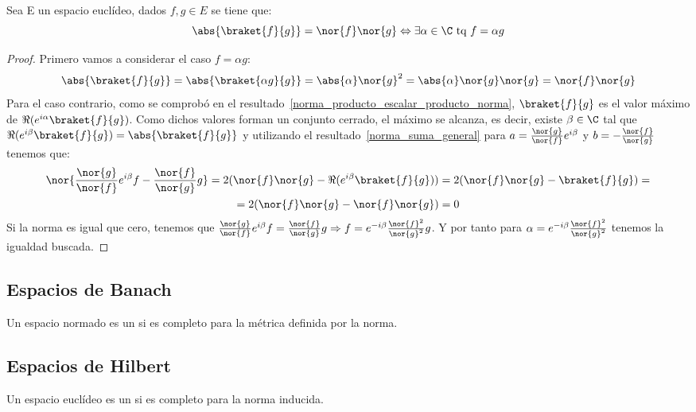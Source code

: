 \begin{proposition}
  Sea E un espacio euclídeo, dados $f,g\in E$ se tiene que:
  \begin{equation}
    \label{norma_producto_escalar_igual_producto_norma}
    \abs{\braket{f}{g}}=\nor{f}\nor{g}\Leftrightarrow \exists\alpha\in\C\text{ tq }f=\alpha g
  \end{equation}
\end{proposition}

\begin{proof}
  Primero vamos a considerar el caso $f=\alpha g$:
  \begin{equation*}
    \abs{\braket{f}{g}}=\abs{\braket{\alpha g}{g}}=\abs{\alpha}\nor{g}^2=\abs{\alpha}\nor{g}\nor{g}=\nor{f}\nor{g}
  \end{equation*}
  Para el caso contrario, como se comprobó en el resultado~\eqref{norma_producto_escalar_producto_norma}, $\braket{f}{g}$ es el valor máximo de $\Re(e^{i\alpha}\braket{f}{g})$. Como dichos valores forman un conjunto cerrado, el máximo se alcanza, es decir, existe $\beta\in\C$ tal que $\Re(e^{i\beta}\braket{f}{g})=\abs{\braket{f}{g}}$ y utilizando el resultado~\eqref{norma_suma_general} para $a=\frac{\nor{g}}{\nor{f}}e^{i\beta}$ y $b=-\frac{\nor{f}}{\nor{g}}$ tenemos que:
  \begin{multline*}
    \nor{\frac{\nor{g}}{\nor{f}}e^{i\beta}f-\frac{\nor{f}}{\nor{g}}g}=2(\nor{f}\nor{g}-\Re(e^{i\beta}\braket{f}{g}))=2(\nor{f}\nor{g}-\braket{f}{g})=\\
    =2(\nor{f}\nor{g}-\nor{f}\nor{g})=0
  \end{multline*}
  Si la norma es igual que cero, tenemos que
  $\frac{\nor{g}}{\nor{f}}e^{i\beta}f=\frac{\nor{f}}{\nor{g}}g\Rightarrow f=e^{-i\beta}\frac{\nor{f}^2}{\nor{g}^2}g$. Y por tanto para $\alpha=e^{-i\beta}\frac{\nor{f}^2}{\nor{g}^2}$ tenemos la igualdad buscada.
\end{proof}

\subsection{Espacios de Banach}
\begin{definition}
  \label{espacio_banach}
  Un espacio normado es un  si es completo para la métrica definida por la norma.
\end{definition}

\subsection{Espacios de Hilbert}
\begin{definition}
  \label{espacio_hilbert}
  Un espacio euclídeo es un  si es completo para la norma inducida.
\end{definition}

